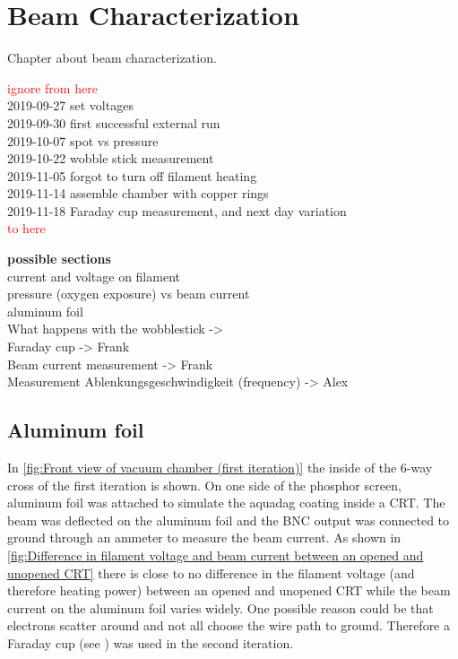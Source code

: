 
\chapter{Beam Characterization}
\label{ch:Beam Characterization}

Chapter about beam characterization.

\noindent \textcolor{red}{ignore from here} \\
2019-09-27 set voltages \\
2019-09-30 first successful external run \\
2019-10-07 spot vs pressure \\
2019-10-22 wobble stick measurement \\
2019-11-05 forgot to turn off filament heating \\
2019-11-14 assemble chamber with copper rings \\
2019-11-18 Faraday cup measurement, and next day variation \\
\textcolor{red}{to here}

\noindent \textbf{possible sections} \\
current and voltage on filament \\
pressure (oxygen exposure) vs beam current \\
aluminum foil \\
What happens with the wobblestick ->  \\
Faraday cup -> Frank \\
Beam current measurement -> Frank \\
Measurement Ablenkungsgeschwindigkeit (frequency) -> Alex \\


\section{Aluminum foil}
\label{sec:Aluminum foil}

In \cref{fig:Front view of vacuum chamber (first iteration)} the inside of the 6-way cross of the first iteration is shown. On one side of the phosphor screen, aluminum foil was attached to simulate the aquadag coating inside a CRT. The beam was deflected on the aluminum foil and the BNC output was connected to ground through an ammeter to measure the beam current. As shown in \cref{fig:Difference in filament voltage and beam current between an opened and unopened CRT} there is close to no difference in the filament voltage (and therefore heating power) between an opened and unopened CRT while the beam current on the aluminum foil varies widely. One possible reason could be that electrons scatter around and not all choose the wire path to ground. Therefore a Faraday cup (see ) was used in the second iteration.


